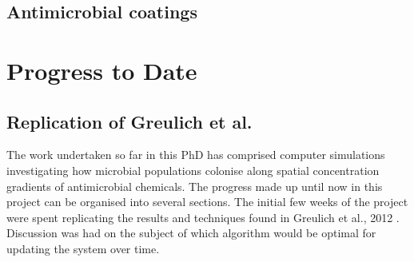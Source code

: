 \documentclass[a4paper,12pt]{article}
\begin{document}
\subsection{Antimicrobial coatings}



% 
% 
% 

\section{Progress to Date}




\subsection{Replication of Greulich et al.}

The work undertaken so far in this PhD has comprised computer simulations investigating how microbial populations colonise along spatial concentration gradients of antimicrobial 
chemicals.  The progress made up until now in this project can be organised into several sections.  The initial few weeks of the project 
were spent replicating the results and techniques found in Greulich et al., 2012 \cite{bioref:PRL-drugGradients}.  Discussion was had
on the subject of which algorithm would be optimal for updating the system over time.  
\end{document}
